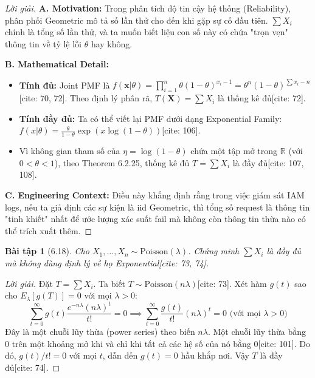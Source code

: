 \documentclass[8pt,a4paper]{article}
\newtheorem{exercise}{Bài tập}
\newenvironment{solution}{\begin{proof}[Lời giải]}{\end{proof}}
\newcommand{\R}{\mathbb{R}}
\begin{document}
\begin{solution}
\textbf{A. Motivation:} Trong phân tích độ tin cậy hệ thống (Reliability), phân phối Geometric mô tả số lần thử cho đến khi gặp sự cố đầu tiên. $\sum X_i$ chính là tổng số lần thử, và ta muốn biết liệu con số này có chứa "trọn vẹn" thông tin về tỷ lệ lỗi $\theta$ hay không.

\textbf{B. Mathematical Detail:}
\begin{itemize}
    \item \textbf{Tính đủ:} Joint PMF là $f(\mathbf{x}|\theta) = \prod_{i=1}^n \theta(1-\theta)^{x_i-1} = \theta^n (1-\theta)^{\sum x_i - n}$[cite: 70, 72]. Theo định lý phân rã, $T(\mathbf{X}) = \sum X_i$ là thống kê đủ[cite: 72].
    \item \textbf{Tính đầy đủ:} Ta có thể viết lại PMF dưới dạng Exponential Family: $f(x|\theta) = \frac{\theta}{1-\theta} \exp(x \log(1-\theta))$[cite: 106].
    \item Vì không gian tham số của $\eta = \log(1-\theta)$ chứa một tập mở trong $\R$ (với $0 < \theta < 1$), theo Theorem 6.2.25, thống kê đủ $T = \sum X_i$ là đầy đủ[cite: 107, 108].
\end{itemize}

\textbf{C. Engineering Context:} Điều này khẳng định rằng trong việc giám sát IAM logs, nếu ta giả định các sự kiện là iid Geometric, thì tổng số request là thông tin "tinh khiết" nhất để ước lượng xác suất fail mà không còn thông tin thừa nào có thể trích xuất thêm.
\end{solution}

\begin{exercise}[6.18]
Cho $X_1, \dots, X_n \sim \text{Poisson}(\lambda)$. Chứng minh $\sum X_i$ là đầy đủ mà không dùng định lý về họ Exponential[cite: 73, 74].
\end{exercise}

\begin{solution}
Đặt $T = \sum X_i$. Ta biết $T \sim \text{Poisson}(n\lambda)$[cite: 73]. Xét hàm $g(t)$ sao cho $E_\lambda[g(T)] = 0$ với mọi $\lambda > 0$:
\[ \sum_{t=0}^\infty g(t) \frac{e^{-n\lambda}(n\lambda)^t}{t!} = 0 \implies \sum_{t=0}^\infty \frac{g(t)}{t!} (n\lambda)^t = 0 \text{ (với mọi } \lambda > 0) \]
Đây là một chuỗi lũy thừa (power series) theo biến $n\lambda$. Một chuỗi lũy thừa bằng 0 trên một khoảng mở khi và chỉ khi tất cả các hệ số của nó bằng 0[cite: 101]. Do đó, $g(t)/t! = 0$ với mọi $t$, dẫn đến $g(t) = 0$ hầu khắp nơi. Vậy $T$ là đầy đủ[cite: 74].
\end{solution}
\end{document}
